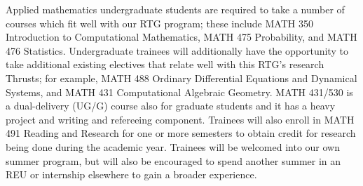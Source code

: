 \documentclass[11pt]{NSFamsart}
\begin{document}
Applied mathematics undergraduate students are required to take a number of courses which fit well with our RTG program; these include MATH 350 Introduction to Computational Mathematics,  MATH 475 Probability, and MATH 476 Statistics. %
Undergraduate trainees will additionally have the opportunity to take additional existing electives %
that relate well with this RTG's research Thrusts; for example, MATH 488 Ordinary Differential Equations and Dynamical Systems, and MATH 431 Computational Algebraic Geometry. %
MATH 431/530 is a dual-delivery (UG/G) course also for graduate students and it has  a heavy project and writing and refereeing component.  Trainees will also enroll in MATH 491 Reading and Research for one or more semesters to obtain credit for research being done during the academic year.  Trainees will be welcomed into our own summer program, but will also be encouraged to spend another summer in an REU or internship elsewhere to gain a broader experience.
\end{document}
